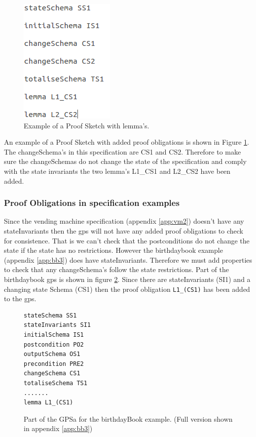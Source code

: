 \begin{figure}[H]
\centering
\includegraphics[scale=0.5]{Figures/skeleton/proofskeletonwithpo.png}
\caption{Example of a Proof Sketch with lemma's.}
\label{fig:gpswithpo}
\end{figure}

An example of a Proof Sketch with added proof obligations is shown in
Figure \ref{fig:gpswithpo}. The changeSchema's in this specification are CS1 and
CS2. Therefore to make sure the changeSchemas do not change the state of the
specification and comply with the state invariants the two lemma's L1\_CS1 and
L2\_CS2 have been added.

\subsubsection{Proof Obligations in specification examples}
Since the vending machine specification (appendix \ref{app:vm2}) doesn't have
any stateInvariants then the \gls{gps} will not have any added proof
obligations to check for consistence. That is we can't check that the
postconditions do not change the state if the state has no restrictions. However
the birthdaybook example (appendix \ref{app:bb3}) does have stateInvariants.
Therefore we must add properties to check that any changeSchema's follow the
state restrictions. Part of the birthdaybook \gls{gps} is shown in figure
\ref{fig:bbgps}. Since there are stateInvariants (SI1) and a changing state
Schema (CS1) then the proof obligation \texttt{L1\_(CS1)} has been added to the
\gls{gps}.

\begin{figure}[H]
\begin{verbatim}
stateSchema SS1 
stateInvariants SI1 
initialSchema IS1 
postcondition PO2 
outputSchema OS1 
precondition PRE2 
changeSchema CS1 
totaliseSchema TS1 
.......
lemma L1_(CS1) 
\end{verbatim}
\caption{Part of the GPSa for the birthdayBook example. (Full version shown in appendix \ref{app:bb3}) \label{fig:bbgps}}
\end{figure}

